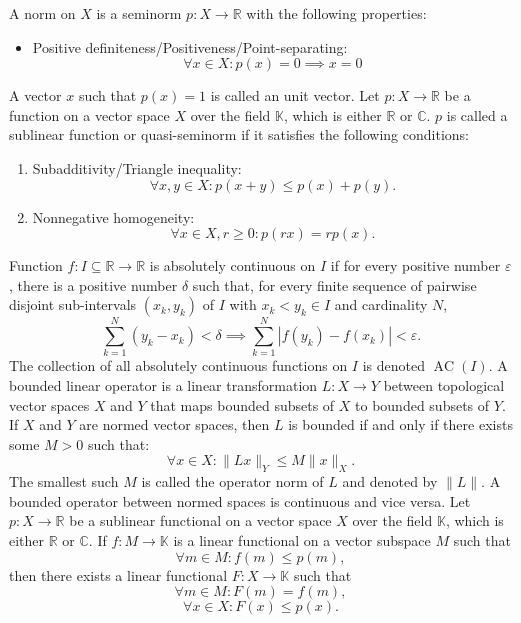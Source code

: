 \documentclass[a4paper,12pt]{article}
\begin{document}
A norm on $X$ is a seminorm $p\colon X\to\mathbb{R}$ with the following properties:
\begin{itemize}
\item Positive definiteness/Positiveness/Point-separating: \[\forall x\in X\colon p(x)=0\implies x=0\]
\end{itemize}
A vector $x$ such that $p(x)=1$ is called an unit vector.
Let $p\colon X\to\mathbb{R}$ be a function on a vector space $X$ over the field $\mathbb{K}$, which is either $\mathbb{R}$ or $\mathbb{C}$. $p$ is called a sublinear function or quasi-seminorm if it satisfies the following conditions:
\begin{enumerate}
\item Subadditivity/Triangle inequality:\[\forall x,y\in X\colon p(x+y)\leq p(x)+p(y).\]
\item Nonnegative homogeneity: \[\forall x\in X,r\geq 0\colon p(rx)=rp(x).\]
\end{enumerate}
Function $f\colon I\subseteq\mathbb{R}\to\mathbb{R}$ is absolutely continuous on $I$ if for every positive number $\varepsilon$, there is a positive number $\delta$ such that, for every finite sequence of pairwise disjoint sub-intervals $(x_k,y_k)$ of $I$ with $x_k<y_k\in I$ and cardinality $N$,
\[\sum_{k=1}^N(y_k-x_k)<\delta\implies\sum_{k=1}^N|f(y_k)-f(x_k)|<\varepsilon.\]
The collection of all absolutely continuous functions on $I$ is denoted $\operatorname {AC} (I)$.
A bounded linear operator is a linear transformation $L\colon X\to Y$ between topological vector spaces $X$ and $Y$ that maps bounded subsets of $X$ to bounded subsets of $Y$. If $X$ and $Y$ are normed vector spaces, then $L$ is bounded if and only if there exists some $M>0$ such that:
\[\forall x\in X\colon \|Lx\|_Y\leq M\|x\|_X.\]
The smallest such $M$ is called the operator norm of $L$ and denoted by $\|L\|$. A bounded operator between normed spaces is continuous and vice versa.
Let $p\colon X\to\mathbb{R}$ be a sublinear functional on a vector space $X$ over the field $\mathbb{K}$, which is either $\mathbb{R}$ or $\mathbb{C}$. If $f\colon M\to\mathbb{K}$ is a linear functional on a vector subspace $M$ such that
\[\forall m\in M\colon f(m)\leq p(m),\]
then there exists a linear functional $F\colon X\to\mathbb{K}$ such that
\[\forall m\in M\colon F(m)=f(m),\]
\[\forall x\in X\colon F(x)\leq p(x).\]
\end{document}
